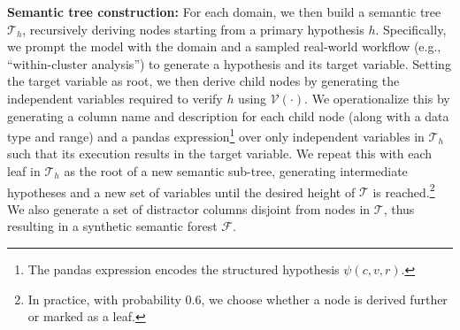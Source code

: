 \textbf{Semantic tree construction:} For each domain, we then build a semantic tree $\mathcal{T}_h$,
recursively deriving nodes starting from a primary hypothesis $h$. Specifically, we prompt the model with the domain and a sampled real-world workflow (e.g., ``within-cluster analysis'') to generate a hypothesis and its target variable.
Setting the target variable as root, we then derive child nodes by generating the independent variables required to verify $h$ using $\mathcal{V}(\cdot)$.
We operationalize this by generating a column name and description for each child node (along with a data type and range) and a pandas expression\footnote{The pandas expression encodes the structured hypothesis $\psi(c,v,r)$.} \citep{mckinney-proc-scipy-2010} over only independent variables in $\mathcal{T}_h$ such that its execution results in the target variable. We repeat this with each leaf in $\mathcal{T}_h$ as the root of a new semantic sub-tree, generating intermediate hypotheses and a new set of variables until the desired height of $\mathcal{T}$ is reached.\footnote{In practice, with probability 0.6, we choose whether a node is derived further or marked as a leaf.}
We also generate a set of distractor columns disjoint from nodes in $\mathcal{T}$, thus resulting in a synthetic semantic forest $\mathcal{F}$.

